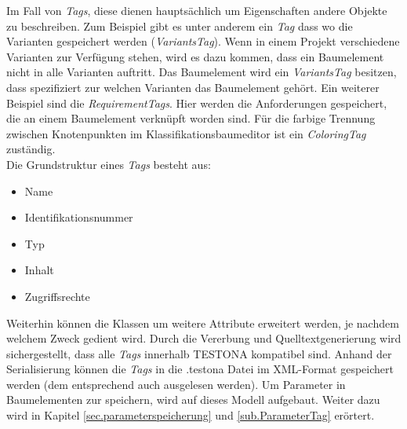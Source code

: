 Im Fall von \textit{Tags}, diese dienen hauptsächlich um Eigenschaften andere Objekte zu beschreiben. Zum Beispiel gibt es unter anderem ein \textit{Tag} dass wo die Varianten gespeichert werden (\textit{VariantsTag}). Wenn in einem Projekt verschiedene Varianten zur Verfügung stehen, wird es dazu kommen, dass ein Baumelement nicht in alle Varianten auftritt. Das Baumelement wird ein \textit{VariantsTag} besitzen, dass spezifiziert zur welchen Varianten das Baumelement gehört. Ein weiterer Beispiel sind die \textit{RequirementTags}. Hier werden die Anforderungen gespeichert, die an einem Baumelement verknüpft worden sind. Für die farbige Trennung zwischen Knotenpunkten im Klassifikationsbaumeditor ist ein \textit{ColoringTag} zuständig.\\

Die Grundstruktur eines \textit{Tags} besteht aus:

\begin{itemize}
\item Name
\item Identifikationsnummer
\item Typ
\item Inhalt
\item Zugriffsrechte
\end{itemize}


Weiterhin können die Klassen um weitere Attribute erweitert werden, je nachdem welchem Zweck gedient wird. Durch die Vererbung und Quelltextgenerierung wird sichergestellt, dass alle \textit{Tags} innerhalb TESTONA kompatibel sind. Anhand der Serialisierung können die \textit{Tags} in die .testona Datei im XML-Format gespeichert werden (dem entsprechend auch ausgelesen werden). Um Parameter in Baumelementen zur speichern, wird auf dieses Modell aufgebaut. Weiter dazu wird in Kapitel \ref{sec.parameterspeicherung} und \ref{sub.ParameterTag} erörtert.
